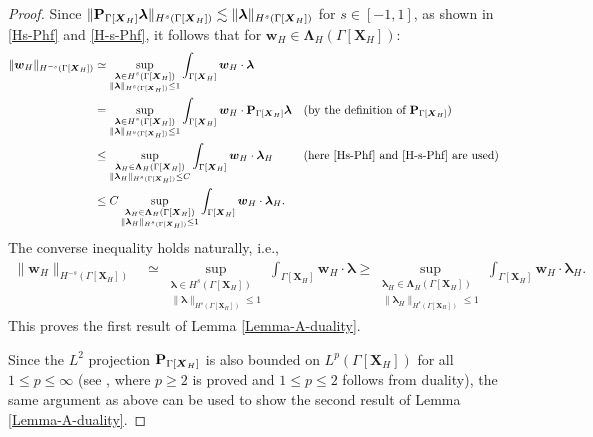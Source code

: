 \documentclass[11pt,reqno]{amsart}
\theoremstyle{definition}
\theoremstyle{plain}
\numberwithin{theorem}{section}
\numberwithin{proposition}{section}
\numberwithin{lemma}{section}
\numberwithin{equation}{section}
\newcommand{\bs}[1]{\boldsymbol{#1}}
\renewcommand{\(}{\bigl(}
\renewcommand{\)}{\bigr)}
\begin{document}
\begin{proof}
Since $\|{\bf P}_{\Gamma[{\bs X}_H]}{\bs\lambda}\|_{H^s(\Gamma[{\bs X}_H])} \lesssim \|{\bs\lambda}\|_{H^s(\Gamma[{\bs X}_H])}$ for $s\in[-1,1]$, as shown in \eqref{Hs-Phf} and \eqref{H-s-Phf}, it follows that for ${\bs w}_H\in {\bs\Lambda}_H(\Gamma[{\bs X}_H])$:
\begin{align*}
\|{\bs w}_H\|_{H^{-s}(\Gamma[{\bs X}_H])}
&\simeq \sup_{\substack{{\bs\lambda}\in H^{s}(\Gamma[{\bs X}_H])\\ \|{\bs\lambda}\|_{H^s(\Gamma[{\bs X}_H])}\le 1}} 
\int_{\Gamma[{\bs X}_H]} {\bs w}_H\cdot {\bs\lambda} \notag\\
&= \sup_{\substack{{\bs\lambda}\in H^{s}(\Gamma[{\bs X}_H])\\ \|{\bs\lambda}\|_{H^s(\Gamma[{\bs X}_H])}\le 1}} 
\int_{\Gamma[{\bs X}_H]} {\bs w}_H\cdot {\bf P}_{\Gamma[{\bs X}_H]}{\bs\lambda} 
&&\mbox{(by the definition of ${\bf P}_{\Gamma[{\bs X}_H]}$)}\notag\\
&\le \sup_{\substack{{\bs\lambda}_H\in {\bs\Lambda}_H(\Gamma[{\bs X}_H])\\ \|{\bs\lambda}_H\|_{H^s(\Gamma[{\bs X}_H])}\le C}} 
\int_{\Gamma[{\bs X}_H]} {\bs w}_H\cdot {\bs\lambda}_H 
&&\mbox{(here \eqref{Hs-Phf} and \eqref{H-s-Phf} are used)} \notag\\
&\le C\sup_{\substack{{\bs\lambda}_H\in {\bs\Lambda}_H(\Gamma[{\bs X}_H])\\ \|{\bs\lambda}_H\|_{H^s(\Gamma[{\bs X}_H])}\le 1}} 
\int_{\Gamma[{\bs X}_H]} {\bs w}_H\cdot {\bs\lambda}_H .
\end{align*}
The converse inequality holds naturally, i.e., 
\begin{align*}
\|{\bs w}_H\|_{H^{-s}(\Gamma[{\bs X}_H])}
&\simeq \sup_{\substack{{\bs\lambda}\in H^{s}(\Gamma[{\bs X}_H])\\ \|{\bs\lambda}\|_{H^s(\Gamma[{\bs X}_H])}\le 1}} 
\int_{\Gamma[{\bs X}_H]} {\bs w}_H\cdot {\bs\lambda} 
\ge \sup_{\substack{{\bs\lambda}_H\in {\bs\Lambda}_H(\Gamma[{\bs X}_H])\\ \|{\bs\lambda}_H\|_{H^s(\Gamma[{\bs X}_H])}\le 1}} 
\int_{\Gamma[{\bs X}_H]} {\bs w}_H\cdot {\bs\lambda}_H .
\end{align*}
This proves the first result of Lemma \ref{Lemma-A-duality}. 

Since the $L^2$ projection ${\bf P}_{\Gamma[\bs X_H]}$ is also bounded on $L^p(\Gamma[\bs X_H])$ for all $1\le p\le \infty$ (see \cite[Appendix B]{Li-Tang-2025}, where $p\ge 2$ is proved and $1\le p\le 2$ follows from duality), the same argument as above can be used to show the second result of Lemma \ref{Lemma-A-duality}. 
\end{proof}
\end{document}
